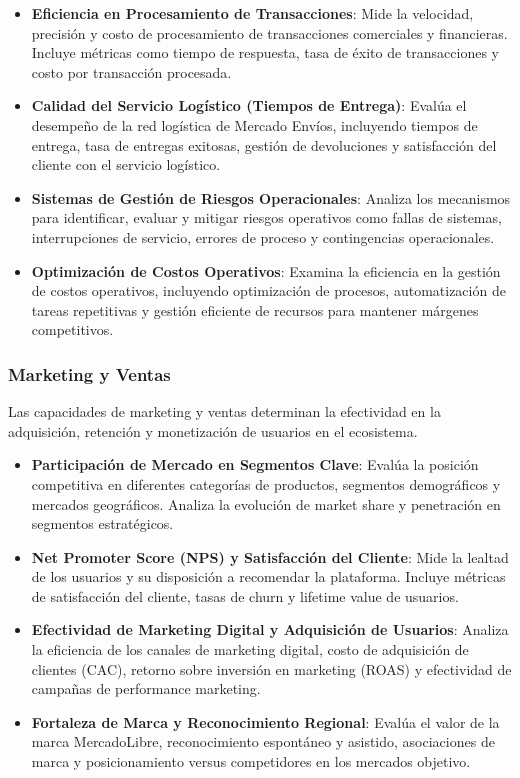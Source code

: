 \begin{itemize}
\item \textbf{Eficiencia en Procesamiento de Transacciones}: Mide la velocidad, precisión y costo de procesamiento de transacciones comerciales y financieras. Incluye métricas como tiempo de respuesta, tasa de éxito de transacciones y costo por transacción procesada.

\item \textbf{Calidad del Servicio Logístico (Tiempos de Entrega)}: Evalúa el desempeño de la red logística de Mercado Envíos, incluyendo tiempos de entrega, tasa de entregas exitosas, gestión de devoluciones y satisfacción del cliente con el servicio logístico.

\item \textbf{Sistemas de Gestión de Riesgos Operacionales}: Analiza los mecanismos para identificar, evaluar y mitigar riesgos operativos como fallas de sistemas, interrupciones de servicio, errores de proceso y contingencias operacionales.

\item \textbf{Optimización de Costos Operativos}: Examina la eficiencia en la gestión de costos operativos, incluyendo optimización de procesos, automatización de tareas repetitivas y gestión eficiente de recursos para mantener márgenes competitivos.
\end{itemize}

\subsubsection{Marketing y Ventas}

Las capacidades de marketing y ventas determinan la efectividad en la adquisición, retención y monetización de usuarios en el ecosistema.

\begin{itemize}
\item \textbf{Participación de Mercado en Segmentos Clave}: Evalúa la posición competitiva en diferentes categorías de productos, segmentos demográficos y mercados geográficos. Analiza la evolución de market share y penetración en segmentos estratégicos.

\item \textbf{Net Promoter Score (NPS) y Satisfacción del Cliente}: Mide la lealtad de los usuarios y su disposición a recomendar la plataforma. Incluye métricas de satisfacción del cliente, tasas de churn y lifetime value de usuarios.

\item \textbf{Efectividad de Marketing Digital y Adquisición de Usuarios}: Analiza la eficiencia de los canales de marketing digital, costo de adquisición de clientes (CAC), retorno sobre inversión en marketing (ROAS) y efectividad de campañas de performance marketing.

\item \textbf{Fortaleza de Marca y Reconocimiento Regional}: Evalúa el valor de la marca MercadoLibre, reconocimiento espontáneo y asistido, asociaciones de marca y posicionamiento versus competidores en los mercados objetivo.
\end{itemize}

